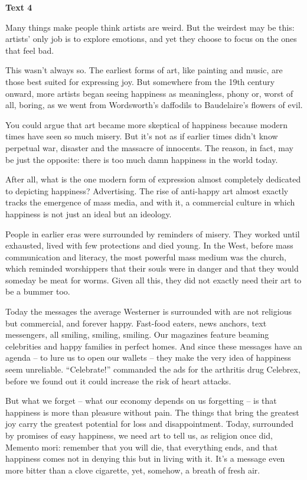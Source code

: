 \begin{center}\textbf{Text 4}\end{center}

\qquad Many things make people think artists are weird. But the weirdest may be this: artists’ only job is to explore emotions, and yet they choose to focus on the ones that feel bad.

\qquad This wasn’t always so. The earliest forms of art, like painting and music, are those best suited for expressing joy. But somewhere from the 19th century onward, more artists began seeing happiness as meaningless, phony or, worst of all, boring, as we went from Wordsworth’s daffodils to Baudelaire’s flowers of evil.

\qquad You could argue that art became more skeptical of happiness because modern times have seen so much misery. But it’s not as if earlier times didn’t know perpetual war, disaster and the massacre of innocents. The reason, in fact, may be just the opposite: there is too much damn happiness in the world today.

\qquad After all, what is the one modern form of expression almost completely dedicated to depicting happiness? Advertising. The rise of anti-happy art almost exactly tracks the emergence of mass media, and with it, a commercial culture in which happiness is not just an ideal but an ideology.

\qquad People in earlier eras were surrounded by reminders of misery. They worked until exhausted, lived with few protections and died young. In the West, before mass communication and literacy, the most powerful mass medium was the church, which reminded worshippers that their souls were in danger and that they would someday be meat for worms. Given all this, they did not exactly need their art to be a bummer too.

\qquad Today the messages the average Westerner is surrounded with are not religious but commercial, and forever happy. Fast-food eaters, news anchors, text messengers, all smiling, smiling, smiling. Our magazines feature beaming celebrities and happy families in perfect homes. And since these messages have an agenda -- to lure us to open our wallets -- they make the very idea of happiness seem unreliable. “Celebrate!” commanded the ads for the arthritis drug Celebrex, before we found out it could increase the risk of heart attacks.

\qquad But what we forget -- what our economy depends on us forgetting -- is that happiness is more than pleasure without pain. The things that bring the greatest joy carry the greatest potential for loss and disappointment. Today, surrounded by promises of easy happiness, we need art to tell us, as religion once did, Memento mori: remember that you will die, that everything ends, and that happiness comes not in denying this but in living with it. It’s a message even more bitter than a clove cigarette, yet, somehow, a breath of fresh air.

